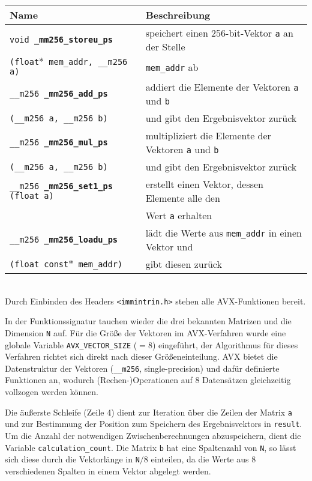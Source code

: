 \documentclass[a4paper,11pt]{scrartcl}
\begin{document}
\begin{tabular}{| l | l |}
\hline
Name & Beschreibung \\ \hline
  
\texttt{void \textbf{\_mm256\_storeu\_ps}} & speichert einen 256-bit-Vektor \texttt{a} an der Stelle\\
\texttt{(float$*$ mem\_addr, \_\_m256 a)} &  \texttt{mem\_addr} ab   \\ \hline

\texttt{\_\_m256 \textbf{\_mm256\_add\_ps}} & addiert die Elemente der Vektoren \texttt{a} und 
\texttt{b} \\
\texttt{(\_\_m256 a, \_\_m256 b)} & und gibt den Ergebnisvektor zurück \\ \hline

\texttt{\_\_m256 \textbf{\_mm256\_mul\_ps}} & multipliziert die Elemente der Vektoren \texttt{a} und \texttt{b} \\
\texttt{(\_\_m256 a, \_\_m256 b)} & und gibt den Ergebnisvektor zurück \\ \hline

\texttt{\_\_m256 \textbf{\_mm256\_set1\_ps} (float a)} & erstellt einen Vektor, dessen Elemente alle den 
\\
& Wert \texttt{a} erhalten \\ \hline

\texttt{\_\_m256 \textbf{\_mm256\_loadu\_ps}} & lädt die Werte aus \texttt{mem\_addr} in einen Vektor und \\
\texttt{(float const$*$ mem\_addr)} & gibt diesen zurück \\ \hline
\end{tabular}\\

Durch Einbinden des Headers \texttt{<immintrin.h>} stehen alle AVX-Funktionen bereit.



In der Funktionssignatur tauchen wieder die drei bekannten Matrizen und die Dimension \texttt{N} auf.
Für die Größe der Vektoren im AVX-Verfahren wurde eine globale Variable \texttt{AVX\_VECTOR\_SIZE} ($=8$)
eingeführt, der Algorithmus für dieses Verfahren richtet sich direkt nach dieser Größeneinteilung.
AVX bietet die Datenstruktur der Vektoren (\texttt{\_\_m256}, single-precision) und dafür definierte Funktionen an, wodurch (Rechen-)Operationen auf 8 Datensätzen gleichzeitig vollzogen werden können.
\newline

Die äußerste Schleife (Zeile 4) dient zur Iteration über die Zeilen der Matrix \texttt{a}
und zur Bestimmung der Position zum Speichern des Ergebnisvektors in \texttt{result}.
Um die Anzahl der notwendigen Zwischenberechnungen abzuspeichern, dient die Variable
\texttt{calculation\_count}. Die Matrix \texttt{b} hat eine Spaltenzahl von \texttt{N},
so lässt sich diese durch die Vektorlänge in \texttt{N}$/8$ einteilen, da die Werte aus 
$8$ verschiedenen Spalten in einem Vektor abgelegt werden.\newline
\end{document}
